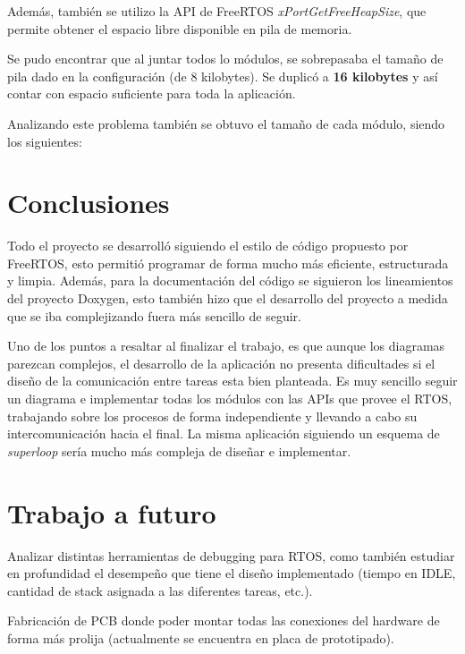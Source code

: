 \documentclass{IEEEtran}
\begin{document}
Además, también se utilizo la API de FreeRTOS \textit{xPortGetFreeHeapSize}, que permite obtener el espacio libre disponible en pila de memoria.

Se pudo encontrar que al juntar todos lo módulos, se sobrepasaba el tamaño de pila dado en la configuración (de 8 kilobytes). Se duplicó a \textbf{16 kilobytes} y así contar con espacio suficiente para toda la aplicación.

Analizando este problema también se obtuvo el tamaño de cada módulo, siendo los siguientes:

\section{Conclusiones}
\label{sec:conclusiones}
Todo el proyecto se desarrolló siguiendo el estilo de código propuesto por FreeRTOS, esto permitió programar de forma mucho más eficiente, estructurada y limpia. Además, para la documentación del código se siguieron los lineamientos del proyecto Doxygen, esto también hizo que el desarrollo del proyecto a medida que se iba complejizando fuera más sencillo de seguir.

Uno de los puntos a resaltar al finalizar el trabajo, es que aunque los diagramas parezcan complejos, el desarrollo de la aplicación no presenta dificultades si el diseño de la comunicación entre tareas esta bien planteada. Es muy sencillo seguir un diagrama e implementar todas los módulos con las APIs que provee el RTOS, trabajando sobre los procesos de forma independiente y llevando a cabo su intercomunicación hacia el final. La misma aplicación siguiendo un esquema de \textit{superloop} sería mucho más compleja de diseñar e implementar.

\section{Trabajo a futuro}
Analizar distintas herramientas de debugging para RTOS, como también estudiar en profundidad el desempeño que tiene el diseño implementado (tiempo en IDLE, cantidad de stack asignada a las diferentes tareas, etc.).

Fabricación de PCB donde poder montar todas las conexiones del hardware de forma más prolija (actualmente se encuentra en placa de prototipado).

\printbibliography
\end{document}
